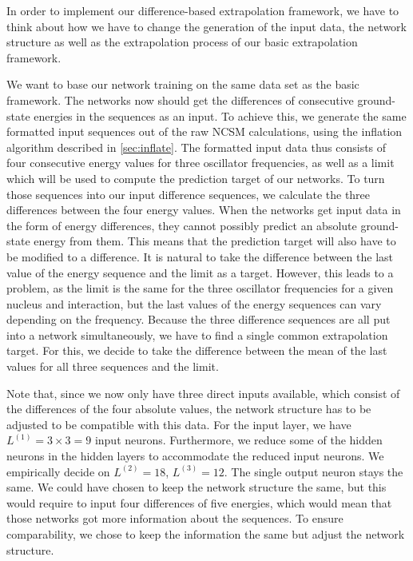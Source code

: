 In order to implement our difference-based extrapolation framework, we have to think about how we have to change the generation of the input data, the network structure as well as the extrapolation process of our basic extrapolation framework.

We want to base our network training on the same data set as the basic framework. The networks now should get the differences of consecutive ground-state energies in the sequences as an input. To achieve this, we generate the same formatted input sequences out of the raw NCSM calculations, using the inflation algorithm described in \autoref{sec:inflate}. The formatted input data thus consists of four consecutive energy values for three oscillator frequencies, as well as a limit which will be used to compute the prediction target of our networks. To turn those sequences into our input difference sequences, we calculate the three differences between the four energy values. When the networks get input data in the form of energy differences, they cannot possibly predict an absolute ground-state energy from them. This means that the prediction target will also have to be modified to a difference. It is natural to take the difference between the last value of the energy sequence and the limit as a target. However, this leads to a problem, as the limit is the same for the three oscillator frequencies for a given nucleus and interaction, but the last values of the energy sequences can vary depending on the frequency. Because the three difference sequences are all put into a network simultaneously, we have to find a single common extrapolation target. For this, we decide to take the difference between the mean of the last values for all three sequences and the limit.

Note that, since we now only have three direct inputs available, which consist of the differences of the four absolute values, the network structure has to be adjusted to be compatible with this data. For the input layer, we have $L^{(1)} = 3 \times 3 = 9$ input neurons. Furthermore, we reduce some of the hidden neurons in the hidden layers to accommodate the reduced input neurons. We empirically decide on $L^{(2)} = 18$, $L^{(3)} = 12$. The single output neuron stays the same. We could have chosen to keep the network structure the same, but this would require to input four differences of five energies, which would mean that those networks got more information about the sequences. To ensure comparability, we chose to keep the information the same but adjust the network structure.

